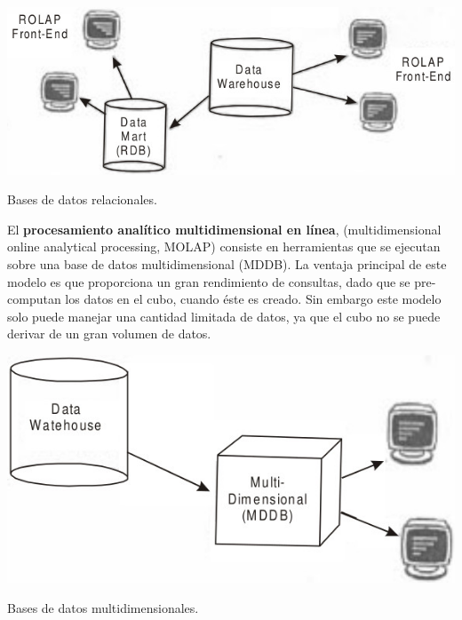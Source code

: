 \documentclass{fancyslides}
\begin{document}
\begin{frame}
\misc
{
  \begin{center}
  \includegraphics[scale=0.4]{RDB&MDDB}
  
  Bases de datos relacionales.
  \end{center}
}
\end{frame}


\begin{frame}
\end{frame}

\begin{frame}
\misc
{
El \textbf{procesamiento analítico multidimensional en línea}, (multidimensional online analytical processing, MOLAP) consiste en herramientas que se ejecutan sobre una base de datos multidimensional (MDDB). La ventaja principal de este modelo es que proporciona un
gran rendimiento de consultas, dado que se pre-computan los datos en el cubo, cuando éste es creado. Sin embargo este modelo solo puede manejar una cantidad limitada de datos, ya que el cubo no se puede derivar de un gran volumen de datos.
}
\end{frame}

\begin{frame}
\misc
{
  \begin{center}
  \includegraphics[scale=0.4]{RDB&MDDB2}
  
  Bases de datos multidimensionales.
  \end{center}
}
\end{frame}
\end{document}
